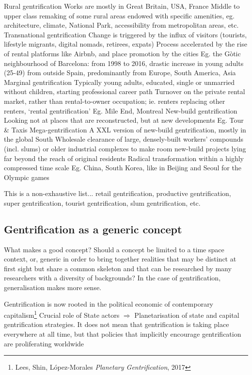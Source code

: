 \documentclass{article}
\begin{document}
\begin{outline}
	\1 Rural gentrification
		\2 Works are mostly in Great Britain, USA, France
		\2 Middle to upper class remaking of some rural areas endowed with specific amenities, eg. architecture, climate, National Park, accessibility from metropolitan areas, etc.
	\1 Transnational gentrification
		\2 Change is triggered by the influx of visitors (tourists, lifestyle migrants, digital nomads, retirees, expats)
		\2 Process accelerated by the rise of rental platforms like Airbnb, and place promotion by the cities
		\2 Eg. the Gòtic neighbourhood of Barcelona: from 1998 to 2016, drastic increase in young adults (25-49) from outside Spain, predominantly from Europe, South America, Asia
	\1 Marginal gentrification
		\2 Typically young adults, educated, single or unmarried without children, starting professional career path
		\2 Turnover on the private rental market, rather than rental-to-owner occupation; ie. renters replacing other renters, `rental gentrification'
		\2 Eg. Mile End, Montreal
	\1 New-build gentrification
		\2 Looking not at places that are reconstructed, but at new developments
		\2 Eg. Tour \& Taxis
	\1 Mega-gentrification
		\2 A XXL version of new-build gentrification, mostly in the global South
		\2 Wholesale clearance of large, densely-built workers' compounds (incl. slums) or older industrial complexes to make room new-build projects lying far beyond the reach of original residents
		\2 Radical transformation within a highly compressed time scale
		\2 Eg. China, South Korea, like in Beijing and Seoul for the Olympic games
\end{outline}

This is a non-exhaustive list... retail gentrification, productive gentrification, super gentrification, tourist gentrification, slum gentrification, etc.

\subsection{Gentrification as a generic concept}

What makes a good concept? Should a concept be limited to a time space context, or, generic in order to bring together realities that may be distinct at first sight but share a common skeleton and that can be researched by many researchers with a diversity of backgrounds? In the case of gentrification, generalisation makes more sense.

\begin{outline}
	\1 Gentrification is now rooted in the political economic of contemporary capitalism\footnote{Lees, Shin, López-Morales \textit{Planetary Gentrification}, 2017}
	\1 Crucial role of State actors
	\1 $\Rightarrow$ Planetarisation of state and capital gentrification strategies. It does not mean that gentrification is taking place everywhere at all time, but that policies that implicitly encourage gentrification are proliferating worldwide
\end{outline}
\end{document}
